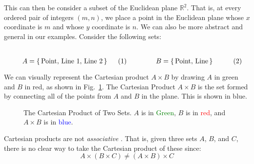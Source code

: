         This can then be consider a subset of the Euclidean plane
        $\mathbb{R}^{2}$. That is, at every ordered pair of integers $(m,n)$,
        we place a point in the Euclidean plane whose $x$ coordinate is $m$ and
        whose $y$ coordinate is $n$. We can also be more abstract and general in
        our examples. Consider the following sets:
        \par
        \begin{subequations}
            \begin{minipage}[b]{0.49\textwidth}
                \centering
                \begin{equation}
                    A=\{\,\textrm{Point, Line 1, Line 2}\,\}
                \end{equation}
            \end{minipage}
            \hfill
            \begin{minipage}[b]{0.49\textwidth}
                \centering
                \begin{equation}
                    B=\{\,\textrm{Point, Line}\,\}
                \end{equation}
            \end{minipage}
        \end{subequations}
        \par\vspace{2.5ex}
        We can visually represent the Cartesian product $A\times{B}$ by
        drawing $A$ in green and $B$ in red, as shown in
        Fig.~\ref{fig:Cartesian_Product_Example}. The Cartesian Product
        $A\times{B}$ is the set formed by connecting all of the points
        from $A$ and $B$ in the plane. This is shown in blue.
        \begin{figure}[H]
            \centering
            
            \caption[Cartesian Product of Two Sets]
                {The Cartesian Product of Two Sets. $A$ is
                 in \textcolor{green}{Green},
                 $B$ is in \textcolor{red}{red}, and
                 $A\times{B}$ is in \textcolor{blue}{blue}.}
            \label{fig:Cartesian_Product_Example}
        \end{figure}
        Cartesian products are not \textit{associative}%
        . That is, given three sets $A$,
        $B$, and $C$, there is no clear way to take the Cartesian
        product of these since:
        \begin{equation}
            A\times(B\times{C})\ne(A\times{B})\times{C}
        \end{equation}
